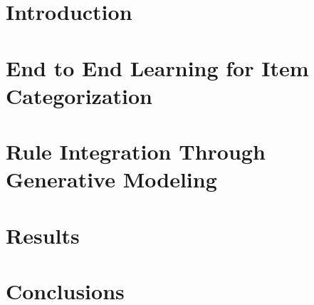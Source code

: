 \documentclass[sigconf]{acmart}
\begin{document}




\maketitle

\section{Introduction}


\section{End to End Learning for Item Categorization}


\section{Rule Integration Through Generative Modeling}


% 

\section{Results}


\section{Conclusions}





\end{document}
